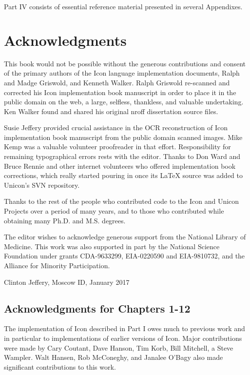 Part IV consists
of essential reference material presented in several Appendixes.

\section*{Acknowledgments}

This book would not be possible without the generous contributions and
consent of the primary authors of the Icon language implementation
documents, Ralph and Madge Griswold, and Kenneth Walker. Ralph
Griswold re-scanned and corrected his Icon implementation book
manuscript in order to place it in the public domain on the web, a
large, selfless, thankless, and valuable undertaking. Ken Walker found
and shared his original nroff dissertation source files.

Susie Jeffery provided crucial assistance in the OCR reconstruction of
Icon implementation book manuscript from the public domain scanned
images. Mike Kemp was a valuable volunteer proofreader in that
effort. Responsibility for remaining typographical errors rests with
the editor. Thanks to Don Ward and Bruce Rennie and other internet
volunteers who offered implementation book corrections, which really
started pouring in once its LaTeX source was added to Unicon's SVN
repository.

Thanks to the rest of the people who contributed code to the Icon and
Unicon Projects over a period of many years, and to those who
contributed while obtaining many Ph.D. and M.S. degrees.

The editor wishes to acknowledge generous support from the National
Library of Medicine. This work was also supported in part by the
National Science Foundation under grants CDA-9633299, EIA-0220590
and EIA-9810732, and the Alliance for Minority Participation.

Clinton Jeffery, Moscow ID, January 2017

\subsection*{Acknowledgments for Chapters 1-12}

The implementation of Icon described in Part I owes much to previous
work and in particular to implementations of earlier versions of
Icon. Major contributions were made by Cary Coutant, Dave Hanson, Tim
Korb, Bill Mitchell, a Steve Wampler. Walt Hansen, Rob McConeghy, and
Janalee O'Bagy also made significant contributions to this work.

